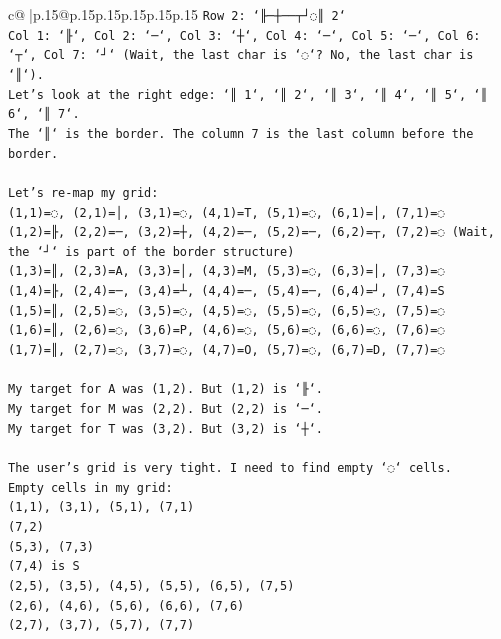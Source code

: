 \documentclass{article}
\begin{document}
{\begin{supertabular}{c@{$\;$}|p{.15\linewidth}@{}p{.15\linewidth}p{.15\linewidth}p{.15\linewidth}p{.15\linewidth}p{.15\linewidth}}
{{{\texttt{Row 2: `╟─┼──┬┘◌║ 2`} \\
\texttt{Col 1: `╟`, Col 2: `─`, Col 3: `┼`, Col 4: `─`, Col 5: `─`, Col 6: `┬`, Col 7: `┘` (Wait, the last char is `◌`? No, the last char is `║`).} \\
\texttt{Let's look at the right edge: `║ 1`, `║ 2`, `║ 3`, `║ 4`, `║ 5`, `║ 6`, `║ 7`.} \\
\texttt{The `║` is the border. The column 7 is the last column before the border.} \\
\\ 
\texttt{Let's re{-}map my grid:} \\
\texttt{(1,1)=◌, (2,1)=│, (3,1)=◌, (4,1)=T, (5,1)=◌, (6,1)=│, (7,1)=◌} \\
\texttt{(1,2)=╟, (2,2)=─, (3,2)=┼, (4,2)=─, (5,2)=─, (6,2)=┬, (7,2)=◌ (Wait, the `┘` is part of the border structure)} \\
\texttt{(1,3)=║, (2,3)=A, (3,3)=│, (4,3)=M, (5,3)=◌, (6,3)=│, (7,3)=◌} \\
\texttt{(1,4)=╟, (2,4)=─, (3,4)=┴, (4,4)=─, (5,4)=─, (6,4)=┘, (7,4)=S} \\
\texttt{(1,5)=║, (2,5)=◌, (3,5)=◌, (4,5)=◌, (5,5)=◌, (6,5)=◌, (7,5)=◌} \\
\texttt{(1,6)=║, (2,6)=◌, (3,6)=P, (4,6)=◌, (5,6)=◌, (6,6)=◌, (7,6)=◌} \\
\texttt{(1,7)=║, (2,7)=◌, (3,7)=◌, (4,7)=O, (5,7)=◌, (6,7)=D, (7,7)=◌} \\
\\ 
\texttt{My target for A was (1,2). But (1,2) is `╟`.} \\
\texttt{My target for M was (2,2). But (2,2) is `─`.} \\
\texttt{My target for T was (3,2). But (3,2) is `┼`.} \\
\\ 
\texttt{The user's grid is very tight. I need to find empty `◌` cells.} \\
\texttt{Empty cells in my grid:} \\
\texttt{(1,1), (3,1), (5,1), (7,1)} \\
\texttt{(7,2)} \\
\texttt{(5,3), (7,3)} \\
\texttt{(7,4) is S} \\
\texttt{(2,5), (3,5), (4,5), (5,5), (6,5), (7,5)} \\
\texttt{(2,6), (4,6), (5,6), (6,6), (7,6)} \\
\texttt{(2,7), (3,7), (5,7), (7,7)} \\
\\ 
}}}
\end{supertabular}}
\end{document}
